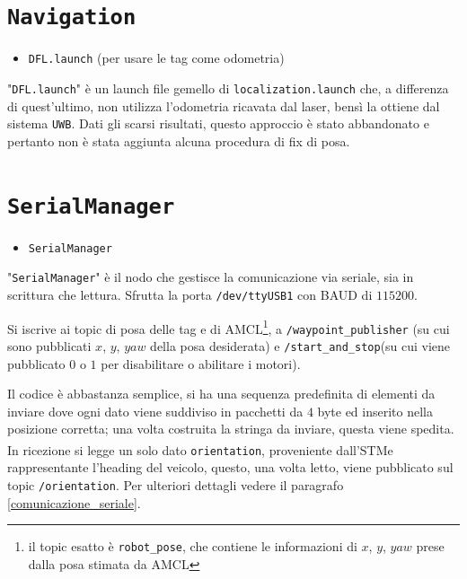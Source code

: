 \section*{\texttt{Navigation}}

\begin{itemize}
    \item \verb!DFL.launch! (per usare le tag come odometria)
\end{itemize}

"\verb!DFL.launch!" è un launch file gemello di \verb!localization.launch! che, a differenza di quest'ultimo, non utilizza l'odometria ricavata dal laser, bensì la ottiene dal sistema \verb!UWB!. Dati gli scarsi risultati, questo approccio è stato abbandonato e pertanto non è stata aggiunta alcuna procedura di fix di posa.

\section*{\texttt{SerialManager}}

\begin{itemize}
    \item \verb!SerialManager!
\end{itemize}

"\verb!SerialManager!" è il nodo che gestisce la comunicazione via seriale, sia in scrittura che lettura.  Sfrutta la porta \verb!/dev/ttyUSB1! con BAUD di $115200$. 

Si iscrive ai topic di posa delle tag e di AMCL\footnote{il topic esatto è \texttt{\/robot\_pose}, che contiene le informazioni di $x$, $y$, $yaw$ prese dalla posa stimata da AMCL}, a \verb!/waypoint_publisher! (su cui sono pubblicati $x$, $y$, $yaw$  della posa desiderata) e \verb!/start_and_stop!(su cui viene pubblicato $0$ o $1$ per disabilitare o abilitare i motori). 

Il codice è abbastanza semplice, si ha una sequenza predefinita di elementi da inviare dove ogni dato viene suddiviso in pacchetti da $4$ byte ed inserito nella posizione corretta; una volta costruita la stringa da inviare, questa viene spedita. In ricezione si legge un solo dato \verb!orientation!, proveniente dall’STM\textsuperscript\textregistered\hspace{1mm}e rappresentante l’heading del veicolo, questo, una volta letto, viene pubblicato sul topic \verb!/orientation!. Per ulteriori dettagli vedere il paragrafo \ref{comunicazione_seriale}.

